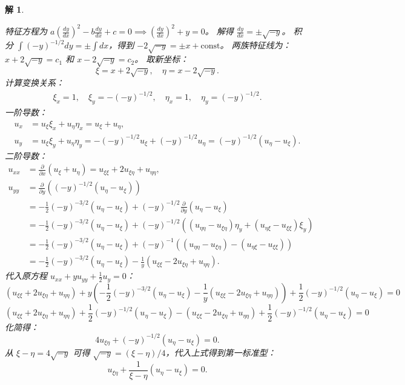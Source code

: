 \documentclass[12pt,a4paper]{article}
\newtheorem*{solution}{解}
\begin{document}
\begin{solution}
\begin{enumerate}[(1)]
			特征方程为 \(a(\frac{dy}{dx})^2 - b\frac{dy}{dx} + c = 0 \implies (\frac{dy}{dx})^2 + y = 0\)。
			解得 \(\frac{dy}{dx} = \pm \sqrt{-y}\)。
			积分 \(\int (-y)^{-1/2} dy = \pm \int dx\)，得到 \(-2\sqrt{-y} = \pm x + \text{const}\)。
			两族特征线为：\(x + 2\sqrt{-y} = c_1\) 和 \(x - 2\sqrt{-y} = c_2\)。
			取新坐标：
			\[ \xi = x + 2\sqrt{-y}, \quad \eta = x - 2\sqrt{-y}. \]
			计算变换关系：
			\begin{align*}
				\xi_x = 1, \quad \xi_y = -(-y)^{-1/2}, \quad \eta_x = 1, \quad \eta_y = (-y)^{-1/2}.
			\end{align*}
			一阶导数：
			\begin{align*}
				u_x &= u_\xi \xi_x + u_\eta \eta_x = u_\xi + u_\eta, \\
				u_y &= u_\xi \xi_y + u_\eta \eta_y = -(-y)^{-1/2} u_\xi + (-y)^{-1/2} u_\eta = (-y)^{-1/2} (u_\eta - u_\xi).
			\end{align*}
			二阶导数：
			\begin{align*}
				u_{xx} &= \frac{\partial}{\partial x}(u_\xi+u_\eta) = u_{\xi\xi} + 2u_{\xi\eta} + u_{\eta\eta}, \\
				u_{yy} &= \frac{\partial}{\partial y}\left((-y)^{-1/2} (u_\eta - u_\xi)\right) \\
				&= -\frac{1}{2}(-y)^{-3/2}(u_\eta-u_\xi) + (-y)^{-1/2} \frac{\partial}{\partial y}(u_\eta-u_\xi) \\
				&= -\frac{1}{2}(-y)^{-3/2}(u_\eta-u_\xi) + (-y)^{-1/2} \left( (u_{\eta\eta}-u_{\xi\eta})\eta_y + (u_{\eta\xi}-u_{\xi\xi})\xi_y \right) \\
				&= -\frac{1}{2}(-y)^{-3/2}(u_\eta-u_\xi) + (-y)^{-1} \left( (u_{\eta\eta}-u_{\xi\eta}) - (u_{\eta\xi}-u_{\xi\xi}) \right) \\
				&= -\frac{1}{2}(-y)^{-3/2}(u_\eta-u_\xi) - \frac{1}{y} (u_{\xi\xi} - 2u_{\xi\eta} + u_{\eta\eta}).
			\end{align*}
			代入原方程 \(u_{xx} + y u_{yy} + \frac{1}{2} u_y = 0\)：
			\[
			(u_{\xi\xi} + 2u_{\xi\eta} + u_{\eta\eta}) + y \left(-\frac{1}{2}(-y)^{-3/2}(u_\eta-u_\xi) - \frac{1}{y} (u_{\xi\xi} - 2u_{\xi\eta} + u_{\eta\eta})\right) + \frac{1}{2}(-y)^{-1/2} (u_\eta - u_\xi) = 0
			\]
			\[
			(u_{\xi\xi} + 2u_{\xi\eta} + u_{\eta\eta}) + \frac{1}{2}(-y)^{-1/2}(u_\eta-u_\xi) - (u_{\xi\xi} - 2u_{\xi\eta} + u_{\eta\eta}) + \frac{1}{2}(-y)^{-1/2} (u_\eta - u_\xi) = 0
			\]
			化简得：
			\[
			4u_{\xi\eta} + (-y)^{-1/2}(u_\eta - u_\xi) = 0.
			\]
			从 \(\xi - \eta = 4\sqrt{-y}\) 可得 \(\sqrt{-y} = (\xi-\eta)/4\)，代入上式得到第一标准型：
			\[ u_{\xi\eta} + \frac{1}{\xi-\eta}(u_\eta - u_\xi) = 0. \]
			

\end{enumerate}
\end{solution}
\end{document}
